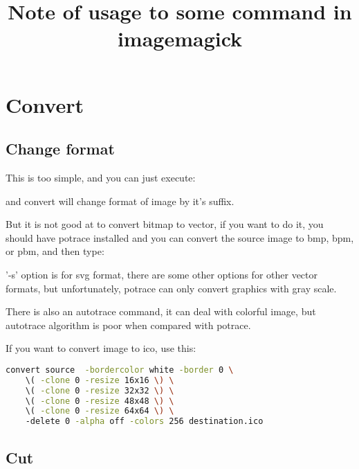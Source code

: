 \documentclass[12pt]{article}
\begin{document}
\title{Note of usage to some command in imagemagick}
\author{}
\maketitle
\tableofcontents
\section{Convert}
\subsection{Change format}
This is too simple, and you can just execute:\vspace{5mm}

{\centering{}\par}\vspace{5mm}

and convert will change format of image by it's suffix.

But it is not good at to convert bitmap to vector, if you want to do it, you should have potrace installed and you can convert the source image to bmp, bpm, or pbm, and then type:\vspace{5mm}

{\centering{}\par}\vspace{5mm}

'-s' option is for svg format, there are some other options for other vector formats, but unfortunately, potrace can only convert graphics with gray scale.

There is also an autotrace command, it can deal with colorful image, but autotrace algorithm is poor when compared with potrace.

If you want to convert image to ico, use this:\vspace{5mm}
\begin{lstlisting}[language=sh, frame=single]
convert source  -bordercolor white -border 0 \ 
	\( -clone 0 -resize 16x16 \) \ 
	\( -clone 0 -resize 32x32 \) \ 
	\( -clone 0 -resize 48x48 \) \ 
	\( -clone 0 -resize 64x64 \) \ 
	-delete 0 -alpha off -colors 256 destination.ico 
\end{lstlisting} \vspace{5mm}
\subsection{Cut}
{\centering{}\par}\vspace{5mm}
\end{document}
